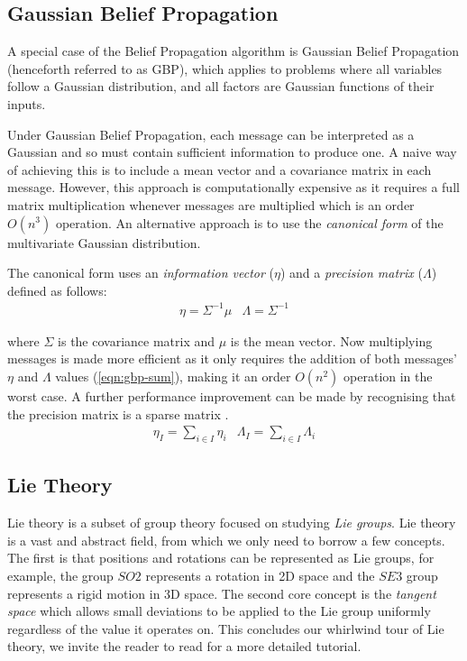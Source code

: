 \subsection{Gaussian Belief Propagation}
A special case of the Belief Propagation algorithm is Gaussian Belief Propagation (henceforth referred to as GBP), which applies to problems where all variables follow a Gaussian distribution, and all factors are Gaussian functions of their inputs.

Under Gaussian Belief Propagation, each message can be interpreted as a Gaussian and so must contain sufficient information to produce one. A naive way of achieving this is to include a mean vector and a covariance matrix in each message. However, this approach is computationally expensive as it requires a full matrix multiplication whenever messages are multiplied which is an order $O(n^3)$ operation. An alternative approach is to use the \textit{canonical form} of the multivariate Gaussian distribution.

The canonical form uses an \textit{information vector} ($\eta$) and a \textit{precision matrix} ($\Lambda$) defined as follows:
\begin{eqnarray}
	\eta = \Sigma^{-1} \mu&
	\Lambda = \Sigma^{-1} \label{eqn:canonical}
\end{eqnarray}

where $\Sigma$ is the covariance matrix and $\mu$ is the mean vector. Now multiplying messages is made more efficient as it only requires the addition of both messages' $\eta$ and $\Lambda$ values (\autoref{eqn:gbp-sum}), making it an order $O(n^2)$ operation in the worst case. A further performance improvement can be made by recognising that the precision matrix is a sparse matrix \cite{GaussianBP}.
\begin{eqnarray}
	\eta_I = \underset{i \in I}{\sum} \eta_i &
	\Lambda_I = \underset{i \in I}{\sum} \Lambda_i \label{eqn:gbp-sum}
\end{eqnarray}

\subsection{Lie Theory}
Lie theory is a subset of group theory focused on studying \textit{Lie groups}. Lie theory is a vast and abstract field, from which we only need to borrow a few concepts. The first is that positions and rotations can be represented as Lie groups, for example, the group $SO2$ represents a rotation in 2D space and the $SE3$ group represents a rigid motion in 3D space. The second core concept is the \textit{tangent space} which allows small deviations to be applied to the Lie group uniformly regardless of the value it operates on. This concludes our whirlwind tour of Lie theory, we invite the reader to read \cite{MicroLieTheory} for a more detailed tutorial.

